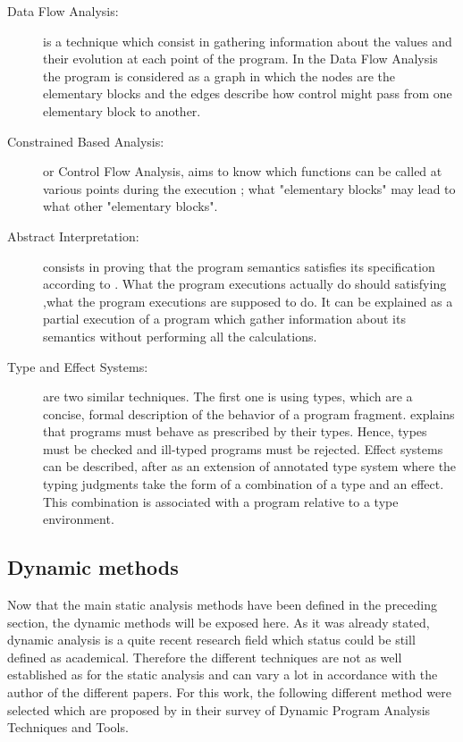 \begin{description}
  \item[Data Flow Analysis:] is a technique which consist in gathering information about the values and their evolution at each point of the program. In the Data Flow Analysis the program is considered as a graph in which the nodes are the elementary blocks and the edges describe how control might pass from one elementary block to another.
  
  \item[Constrained Based Analysis:] or Control Flow Analysis, aims to know which functions can be called at various points during the execution ; what "elementary blocks" may lead to what other "elementary blocks".
  
  \item[Abstract Interpretation:] consists in proving that the program semantics satisfies its specification according to \cite{Cousot2008}. What the program executions actually do should satisfying ,what the program executions are supposed to do. It can be explained as a partial execution of a program which gather information about its semantics without performing all the calculations.
  
  \item[Type and Effect Systems:] are two similar techniques. The first one is using types, which are a concise, formal description of the behavior of a program fragment. \cite{Remy2017} explains that programs must behave as prescribed by their types. Hence, types must be checked and ill-typed programs must be rejected. Effect systems can be described, after \cite{Nielson1999} as an extension of annotated type system where the typing judgments take the form of a combination of a type and an effect. This combination is associated with a program relative to a type environment.
\end{description}


\subsection{Dynamic methods}

Now that the main static analysis methods have been defined in the preceding section, the dynamic methods will be exposed here. As it was already stated, dynamic analysis is a quite recent research field which status could be still defined as academical. Therefore the different techniques are not as well established as for the static analysis and can vary a lot in accordance with the author of the different papers. For this work, the following different method were selected which are proposed by \cite{Gosain2015} in their survey of Dynamic Program Analysis Techniques and Tools. 

